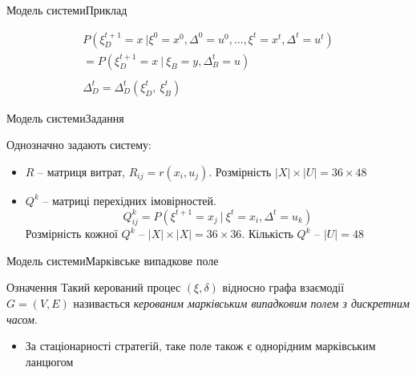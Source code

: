\documentclass[pdf]{beamer}
\begin{document}
\begin{frame}{Модель системи}{Приклад}
	\begin{center}
	\end{center}
	
	\begin{gather*}
	P(\xi_D^{t+1} = x\ |\xi^0 = x^0, \Delta^0 = u^0, \ldots, \xi^t = x^t, \Delta^t = u^t) \\
	= P(\xi_D^{t+1} = x\ |\ \xi_B = y, \Delta_B^t = u) \\
	\\
	\Delta_D^{t} = \Delta_D^{t}(\xi_D^t,\ \xi_B^t)
	\end{gather*}
\end{frame}


\begin{frame}{Модель системи}{Задання}

Однозначно задають систему:
\begin{itemize}
	\item \(R\) – матриця витрат, \(R_{ij} = r(x_i, u_j)\). Розмірність \(|X| \times |U| = 36 \times 48\)
	\item \(Q^k\) – матриці перехідних імовірностей. 
	\[Q_{ij}^k = P(\xi^{t+1} = x_j\ |\ \xi^t = x_i, \Delta^t = u_k)\]
	Розмірність кожної \(Q^k\) – \(|X| \times |X| = 36 \times 36\). Кількість \(Q^k\) – \(|U| = 48\)
\end{itemize}

\end{frame}


\begin{frame}{Модель системи}{Марківське випадкове поле}
\begin{block}{Означення}
Такий керований процес \((\xi, \delta)\) відносно графа взаємодії \(G = (V, E)\) називається \textit{керованим марківським випадковим полем з дискретним часом}.
\end{block}
\begin{itemize}
\item<2->{За стаціонарності стратегій, таке поле також є однорідним марківським ланцюгом}
\end{itemize}
\end{frame}
\end{document}
